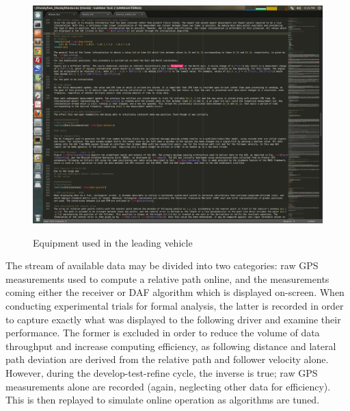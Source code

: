 \documentclass[12pt]{report}
\begin{document}
\begin{figure}[ht] \centering \label{fig:hardwarelead}
    \includegraphics[width=6.5in]{./figs/leader_hardware.png}
    \caption{Equipment used in the leading vehicle}
\end{figure}

The stream of available data may be divided into two categories: raw GPS measurements used to compute a relative path online, and the measurements coming either the receiver or DAF algorithm which is displayed on-screen. When conducting experimental trials for formal analysis, the latter is recorded in order to capture exactly what was displayed to the following driver and examine their performance. The former is excluded in order to reduce the volume of data throughput and increase computing efficiency, as following distance and lateral path deviation are derived from the relative path and follower velocity alone. 
However, during the develop-test-refine cycle, the inverse is true; raw GPS measurements alone are recorded (again, neglecting other data for efficiency). This is then replayed to simulate online operation as algorithms are tuned.
\end{document}

